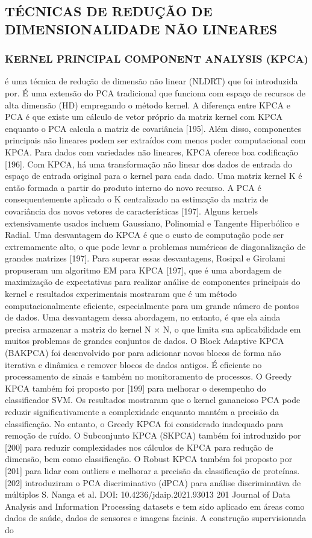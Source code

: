 \subsection{TÉCNICAS DE REDUÇÃO DE DIMENSIONALIDADE NÃO LINEARES}

\subsubsection{KERNEL PRINCIPAL COMPONENT ANALYSIS (KPCA)}
é uma técnica de redução de dimensão não linear (NLDRT) que foi introduzida por. É uma extensão do PCA tradicional que funciona com espaço de recursos de alta dimensão (HD) empregando o método kernel. A diferença entre KPCA e PCA é que existe um cálculo de vetor próprio da matriz kernel com KPCA enquanto o PCA calcula a matriz de covariância [195]. Além disso, componentes principais não lineares podem ser extraídos com menos poder computacional com KPCA. Para dados com variedades não lineares, KPCA oferece boa codificação [196]. Com KPCA, há uma transformação não linear dos dados de entrada do espaço de entrada original para o kernel para cada dado. Uma matriz kernel K é então formada a partir do produto interno do novo recurso. A PCA é consequentemente aplicado o K centralizado na estimação da matriz de covariância dos novos vetores de características [197]. Alguns kernels extensivamente usados incluem Gaussiano, Polinomial e Tangente Hiperbólico e Radial. Uma desvantagem do KPCA é que o custo de computação pode ser extremamente alto, o que pode levar a problemas numéricos de diagonalização de grandes matrizes [197]. Para superar essas desvantagens, Rosipal e Girolami propuseram um algoritmo EM para KPCA [197], que é uma abordagem de maximização de expectativas para realizar análise de componentes principais do kernel e resultados experimentais mostraram que é um método computacionalmente eficiente, especialmente para um grande número de pontos de dados. Uma desvantagem dessa abordagem, no entanto, é que ela ainda precisa armazenar a matriz do kernel N × N, o que limita sua aplicabilidade em muitos problemas de grandes conjuntos de dados. O Block Adaptive KPCA (BAKPCA) foi desenvolvido por  para adicionar novos blocos de forma não iterativa e dinâmica e remover blocos de dados antigos. É eficiente no processamento de sinais e também no monitoramento de processos. O Greedy KPCA também foi proposto por [199] para melhorar o desempenho do classificador SVM. Os resultados mostraram que o kernel ganancioso PCA pode reduzir significativamente a complexidade enquanto mantém a precisão da classificação. No entanto, o Greedy KPCA foi considerado inadequado para remoção de ruído. O Subconjunto KPCA (SKPCA) também foi introduzido por [200] para reduzir complexidades nos cálculos de KPCA para redução de dimensão, bem como classificação. O Robust KPCA também foi proposto por [201] para lidar com outliers e melhorar a precisão da classificação de proteínas. [202] introduziram o PCA discriminativo (dPCA) para análise discriminativa de múltiplos S. Nanga et al. DOI: 10.4236/jdaip.2021.93013 201 Journal of Data Analysis and Information Processing datasets e tem sido aplicado em áreas como dados de saúde, dados de sensores e imagens faciais. A construção supervisionada do 